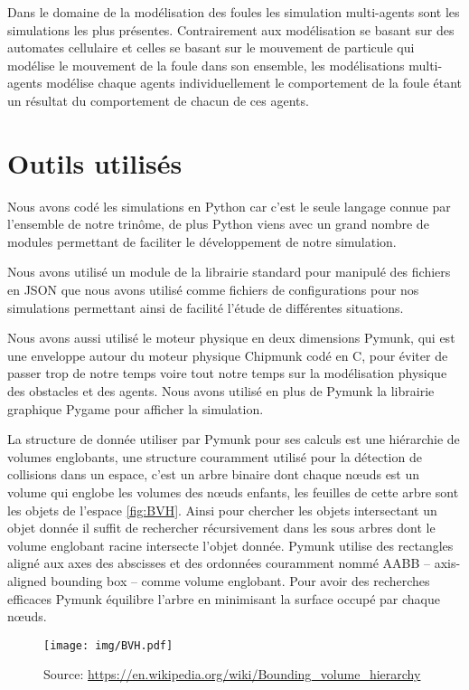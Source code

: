 \documentclass{article}
\newcommand{\source}[1]{\caption*{Source: #1}}
\begin{document}
Dans le domaine de la modélisation des foules les simulation multi-agents sont
les simulations les plus présentes. Contrairement aux modélisation se basant sur
des automates cellulaire et celles se basant sur le mouvement de particule
qui modélise le mouvement de la foule dans son ensemble, les modélisations
multi-agents modélise chaque agents individuellement le comportement de la foule
étant un résultat du comportement de chacun de ces agents.

\section{Outils utilisés}

Nous avons codé les simulations en Python car c'est le seule langage connue
par l'ensemble de notre trinôme, de plus Python viens avec un grand nombre
de modules permettant de faciliter le développement de notre simulation.

Nous avons utilisé un module de la librairie standard pour manipulé des
fichiers en JSON que nous avons utilisé comme
fichiers de configurations pour nos simulations permettant ainsi de facilité
l'étude de différentes situations.

Nous avons aussi utilisé le moteur physique en deux dimensions Pymunk,
qui est une enveloppe autour du moteur physique Chipmunk codé en C, pour
éviter de passer trop de notre temps voire tout notre temps sur la
modélisation physique des obstacles et des agents. Nous avons utilisé en
plus de Pymunk la librairie graphique Pygame pour afficher la simulation.

La structure de donnée utiliser par Pymunk pour ses calculs est une
hiérarchie de volumes englobants, une structure couramment utilisé pour la
détection de collisions dans un espace, c'est un arbre binaire dont chaque
nœuds est un volume qui englobe les volumes des nœuds enfants, les feuilles
de cette arbre sont les objets de l'espace \autoref{fig:BVH}. Ainsi pour chercher les
objets intersectant un objet donnée il suffit de rechercher récursivement
dans les sous arbres dont le volume englobant racine intersecte l'objet
donnée. Pymunk utilise des rectangles aligné aux axes des abscisses et des
ordonnées couramment nommé AABB -- axis-aligned bounding box -- comme
volume englobant.
Pour avoir des recherches efficaces Pymunk équilibre l'arbre en
minimisant la surface occupé par chaque nœuds.

\begin{figure}[h]
  \texttt{[image: img/BVH.pdf]}
  \caption{Un exemple de BVH}
  \source{\url{https://en.wikipedia.org/wiki/Bounding_volume_hierarchy}}
  \label{fig:BVH}
\end{figure}
\end{document}
